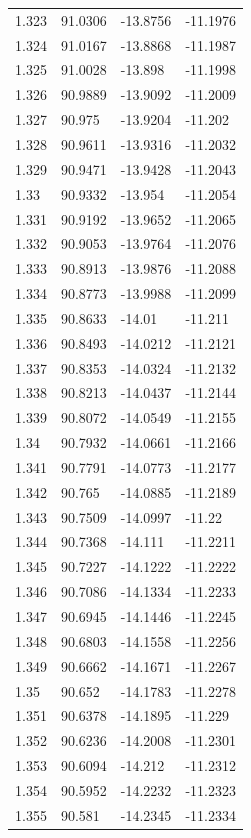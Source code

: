 \begin{tabular}{llll}
1.323 & 91.0306 & -13.8756 & -11.1976 \\
1.324 & 91.0167 & -13.8868 & -11.1987 \\
1.325 & 91.0028 & -13.898 & -11.1998 \\
1.326 & 90.9889 & -13.9092 & -11.2009 \\
1.327 & 90.975 & -13.9204 & -11.202 \\
1.328 & 90.9611 & -13.9316 & -11.2032 \\
1.329 & 90.9471 & -13.9428 & -11.2043 \\
1.33 & 90.9332 & -13.954 & -11.2054 \\
1.331 & 90.9192 & -13.9652 & -11.2065 \\
1.332 & 90.9053 & -13.9764 & -11.2076 \\
1.333 & 90.8913 & -13.9876 & -11.2088 \\
1.334 & 90.8773 & -13.9988 & -11.2099 \\
1.335 & 90.8633 & -14.01 & -11.211 \\
1.336 & 90.8493 & -14.0212 & -11.2121 \\
1.337 & 90.8353 & -14.0324 & -11.2132 \\
1.338 & 90.8213 & -14.0437 & -11.2144 \\
1.339 & 90.8072 & -14.0549 & -11.2155 \\
1.34 & 90.7932 & -14.0661 & -11.2166 \\
1.341 & 90.7791 & -14.0773 & -11.2177 \\
1.342 & 90.765 & -14.0885 & -11.2189 \\
1.343 & 90.7509 & -14.0997 & -11.22 \\
1.344 & 90.7368 & -14.111 & -11.2211 \\
1.345 & 90.7227 & -14.1222 & -11.2222 \\
1.346 & 90.7086 & -14.1334 & -11.2233 \\
1.347 & 90.6945 & -14.1446 & -11.2245 \\
1.348 & 90.6803 & -14.1558 & -11.2256 \\
1.349 & 90.6662 & -14.1671 & -11.2267 \\
1.35 & 90.652 & -14.1783 & -11.2278 \\
1.351 & 90.6378 & -14.1895 & -11.229 \\
1.352 & 90.6236 & -14.2008 & -11.2301 \\
1.353 & 90.6094 & -14.212 & -11.2312 \\
1.354 & 90.5952 & -14.2232 & -11.2323 \\
1.355 & 90.581 & -14.2345 & -11.2334 \\

\end{tabular}
